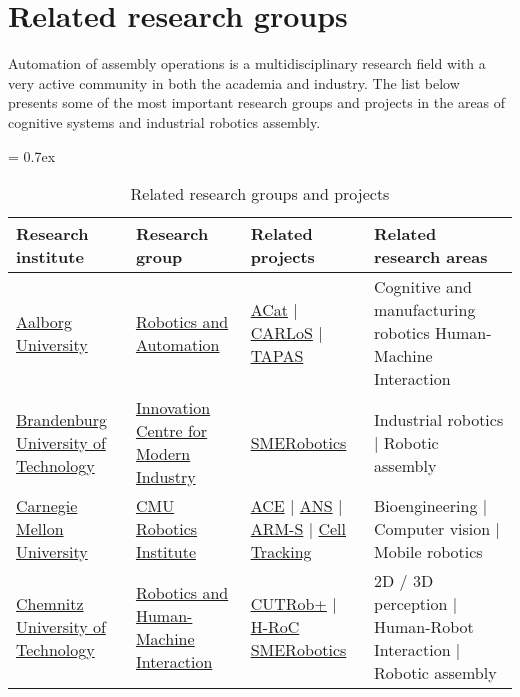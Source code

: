 \section{Related research groups}

Automation of assembly operations is a multidisciplinary research field with a very active community in both the academia and industry. The list below presents some of the most important research groups and projects in the areas of cognitive systems and industrial robotics assembly.

\begin{table}[H]
	\caption{Related research groups and projects}
	\tabulinesep = 0.7ex
	\centering
	\scriptsize
	\begin{tabu} { X[m,c] X[0.9,m,c] X[1.2,m,c] X[1.8,m,c] }
		\rowfont{\bfseries\itshape} Research institute & Research group & Related projects & Related research areas \\
		\hline
		\href{http://www.en.aau.dk}{Aalborg University} &
		\href{http://robotics-automation.aau.dk}{Robotics and Automation} &
		\href{http://www.acat-project.eu/}{ACat} | \href{http://carlosproject.eu/}{CARLoS} | \href{http://tapas-project.eu/}{TAPAS} &
		Cognitive and manufacturing robotics Human-Machine Interaction \\

		\tabucline[1pt on 1.5pt off 3pt]{-}
		\href{https://www.b-tu.de/en}{Brandenburg University of Technology} &
		\href{https://www.b-tu.de/en/research/research-projects/innovation-center-modern-industry-brandenburg}{Innovation Centre for Modern Industry} &
		\href{http://www.smerobotics.org/AUTOMATICA/exhibit-06-2016.html}{SMERobotics} &
		Industrial robotics | Robotic assembly \\

		\tabucline[1pt on 1.5pt off 3pt]{-}
		\href{http://www.cmu.edu}{Carnegie Mellon University} &
		\href{https://www.ri.cmu.edu}{CMU Robotics Institute} &
		\href{http://www.frc.ri.cmu.edu/projects/ace}{ACE} | \href{https://www.ri.cmu.edu/research_project_detail.html?project_id=550\&menu_id=261}{ANS} | \href{http://www.nrec.ri.cmu.edu/projects/arms}{ARM-S} | \href{https://www.ri.cmu.edu/research_project_detail.html?project_id=579\&menu_id=261}{Cell Tracking} &
		Bioengineering | Computer vision | Mobile robotics \\

		\tabucline[1pt on 1.5pt off 3pt]{-}
		\href{https://www.tu-chemnitz.de}{Chemnitz University of Technology} &
		\href{https://www.tu-chemnitz.de/etit/robosys/index.php.en}{Robotics and Human-Machine Interaction} &
		\href{http://www.euroc-project.eu/index.php?id=challenger_cutrob}{CUTRob+} | \href{http://www.drematrix.de/projects/hroc-human-robot-cooperation/}{H-RoC} \href{http://www.smerobotics.org/AUTOMATICA/exhibit-02-2016.html}{SMERobotics} &
		2D / 3D perception | Human-Robot Interaction | Robotic assembly \\


\end{tabu}
\end{table}
